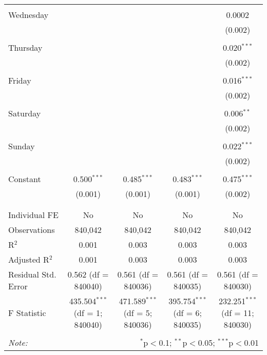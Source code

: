 \documentclass[
]{article}
\begin{document}
\begin{table}[!htbp]
{\begin{tabular}{@{\extracolsep{5pt}}lcccc}
  & & & & \\ 
 Wednesday &  &  &  & 0.0002 \\ 
  &  &  &  & (0.002) \\ 
  & & & & \\ 
 Thursday &  &  &  & 0.020$^{***}$ \\ 
  &  &  &  & (0.002) \\ 
  & & & & \\ 
 Friday &  &  &  & 0.016$^{***}$ \\ 
  &  &  &  & (0.002) \\ 
  & & & & \\ 
 Saturday &  &  &  & 0.006$^{**}$ \\ 
  &  &  &  & (0.002) \\ 
  & & & & \\ 
 Sunday &  &  &  & 0.022$^{***}$ \\ 
  &  &  &  & (0.002) \\ 
  & & & & \\ 
 Constant & 0.500$^{***}$ & 0.485$^{***}$ & 0.483$^{***}$ & 0.475$^{***}$ \\ 
  & (0.001) & (0.001) & (0.001) & (0.002) \\ 
  & & & & \\ 
\hline \\[-1.8ex] 
Individual FE & No & No & No & No \\ 
Observations & 840,042 & 840,042 & 840,042 & 840,042 \\ 
R$^{2}$ & 0.001 & 0.003 & 0.003 & 0.003 \\ 
Adjusted R$^{2}$ & 0.001 & 0.003 & 0.003 & 0.003 \\ 
Residual Std. Error & 0.562 (df = 840040) & 0.561 (df = 840036) & 0.561 (df = 840035) & 0.561 (df = 840030) \\ 
F Statistic & 435.504$^{***}$ (df = 1; 840040) & 471.589$^{***}$ (df = 5; 840036) & 395.754$^{***}$ (df = 6; 840035) & 232.251$^{***}$ (df = 11; 840030) \\ 
\hline 
\hline \\[-1.8ex] 
\textit{Note:}  & \multicolumn{4}{r}{$^{*}$p$<$0.1; $^{**}$p$<$0.05; $^{***}$p$<$0.01} \\ 
\end{tabular}
} 
\end{table} 
\newpage
\end{document}

